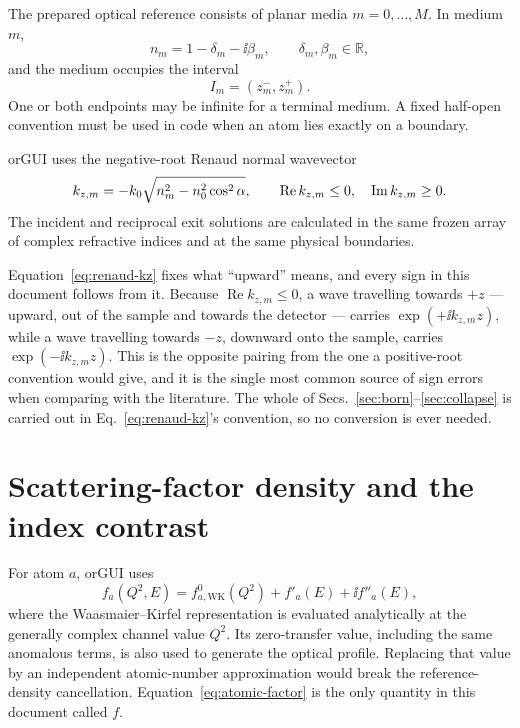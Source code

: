 The prepared optical reference consists of planar media $m=0,\ldots,M$.  In
medium $m$,
\begin{equation}
  n_m=1-\delta_m-\ii\beta_m,
  \qquad \delta_m,\beta_m\in\mathbb R,
  \label{eq:index}
\end{equation}
and the medium occupies the interval
\begin{equation}
  I_m=(z_m^-,z_m^+).
\end{equation}
One or both endpoints may be infinite for a terminal medium.  A fixed
half-open convention must be used in code when an atom lies exactly on a
boundary.

orGUI uses the negative-root Renaud normal wavevector
\begin{equation}
  k_{z,m}=-k_0
  \sqrt{n_m^2-n_0^2\cos^2\alpha},
  \qquad
  \operatorname{Re}k_{z,m}\leq0,
  \quad
  \operatorname{Im}k_{z,m}\geq0.
  \label{eq:renaud-kz}
\end{equation}
The incident and reciprocal exit solutions are calculated in the same frozen
array of complex refractive indices and at the same physical boundaries.

Equation~\eqref{eq:renaud-kz} fixes what ``upward'' means, and every sign in
this document follows from it.  Because $\operatorname{Re}k_{z,m}\leq0$, a
wave travelling towards $+z$ --- upward, out of the sample and towards the
detector --- carries $\exp(+\ii k_{z,m}z)$, while a wave travelling towards
$-z$, downward onto the sample, carries $\exp(-\ii k_{z,m}z)$.  This is the
opposite pairing from the one a positive-root convention would give, and it is
the single most common source of sign errors when comparing with the
literature.  The whole of Secs.~\ref{sec:born}--\ref{sec:collapse} is carried
out in Eq.~\eqref{eq:renaud-kz}'s convention, so no conversion is ever needed.

\section{Scattering-factor density and the index contrast}

For atom $a$, orGUI uses
\begin{equation}
  f_a(Q^2,E)=f^0_{a,\mathrm{WK}}(Q^2)+f'_a(E)+\ii f''_a(E),
  \label{eq:atomic-factor}
\end{equation}
where the Waasmaier--Kirfel representation is evaluated analytically at the
generally complex channel value $Q^2$.  Its zero-transfer value, including the
same anomalous terms, is also used to generate the optical profile.  Replacing
that value by an independent atomic-number approximation would break the
reference-density cancellation.  Equation~\eqref{eq:atomic-factor} is the only
quantity in this document called $f$.

